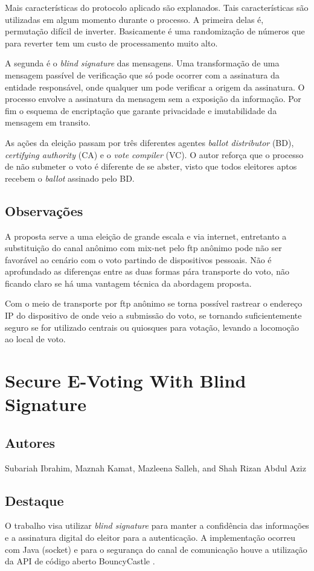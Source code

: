 \documentclass[letterpaper, 12 pt, conference]{ieeeconf}
\begin{document}
        Mais características do protocolo aplicado são explanados. Tais características são utilizadas em algum momento durante o processo. A primeira delas é, permutação difícil de inverter. Basicamente é uma randomização de números que para reverter tem um custo de processamento muito alto.
        
        A segunda é o \textit{blind signature} das mensagens. Uma transformação de uma mensagem passível de verificação que só pode ocorrer com a assinatura da entidade responsável, onde qualquer um pode verificar a origem da assinatura. O processo envolve a assinatura da mensagem sem a exposição da informação. Por fim o esquema de encriptação que garante privacidade e imutabilidade da mensagem em transito.
        
        As ações da eleição passam por três diferentes agentes \textit{ballot distributor} (BD), \textit{certifying authority} (CA) e o \textit{vote compiler} (VC). O autor reforça que o processo de não submeter o voto é diferente de se abster, visto que todos eleitores aptos recebem o \textit{ballot} assinado pelo BD. 
        
    \subsection{Observações}
        A proposta serve a uma eleição de grande escala e via internet, entretanto a substituição do canal anônimo com mix-net pelo ftp anônimo pode não ser favorável ao cenário com o voto partindo de dispositivos pessoais. Não é aprofundado as diferenças entre as duas formas pára transporte do voto, não ficando claro se há uma vantagem técnica da abordagem proposta.
        
        Com o meio de transporte por ftp anônimo se torna possível rastrear o endereço IP do dispositivo de onde veio a submissão do voto, se tornando suficientemente seguro se for utilizado centrais ou quiosques para votação, levando a locomoção ao local de voto.
        
\section{Secure E-Voting With Blind Signature}
    \subsection{Autores}
        Subariah Ibrahim, Maznah Kamat, Mazleena Salleh, and Shah Rizan Abdul Aziz
    \subsection{Destaque}
        O trabalho visa utilizar \textit{blind signature} para manter a confidência das informações e a assinatura digital do eleitor para a autenticação. A implementação ocorreu com Java (socket) e para o segurança do canal de comunicação houve a utilização da API de código aberto BouncyCastle \cite{BouncyCastle}.
        
\end{document}
